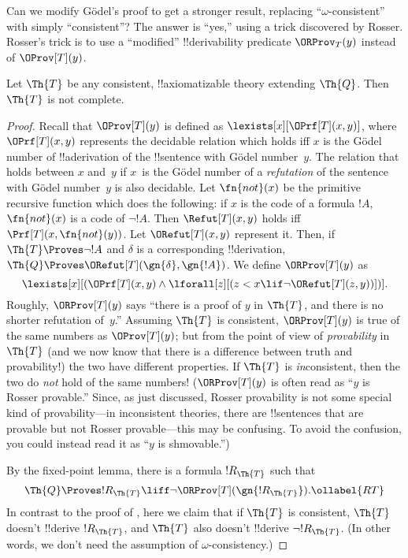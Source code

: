 \documentclass[../../../include/open-logic-section]{subfiles}
\begin{document}

Can we modify G\"odel's proof to get a stronger result, replacing
``$\omega$-consistent'' with simply ``consistent''? The answer is
``yes,'' using a trick discovered by Rosser.  Rosser's trick is to use
a ``modified'' !!{derivability} predicate $\ORProv_T(y)$ instead of
$\OProv[T](y)$.

\begin{thm}
Let $\Th{T}$ be any consistent, !!{axiomatizable} theory
extending $\Th{Q}$. Then $\Th{T}$ is not complete.
\end{thm}

\begin{proof}
Recall that $\OProv[T](y)$ is defined as $\lexists[x][\OPrf[T](x,
  y)]$, where $\OPrf[T](x, y)$ represents the decidable relation which
holds iff $x$ is the G\"odel number of !!a{derivation} of the
!!{sentence} with G\"odel number~$y$. The relation that holds between
$x$ and~$y$ if $x$~is the G\"odel number of a \emph{refutation} of the
sentence with G\"odel number~$y$ is also decidable. Let $\fn{not}(x)$
be the primitive recursive function which does the following: if $x$
is the code of a formula $!A$, $\fn{not}(x)$ is a code of $\lnot
!A$. Then $\Refut[T](x, y)$ holds iff $\Prf[T](x, \fn{not}(y))$.  Let
$\ORefut[T](x, y)$ represent it.  Then, if $\Th{T} \Proves \lnot !A$
and $\delta$ is a corresponding !!{derivation}, $\Th{Q} \Proves
\ORefut[T](\gn{\delta}, \gn{!A})$.  We define $\ORProv[T](y)$ as
\[
\lexists[x][(\OPrf[T](x,y) \land \lforall[z][(z < x \lif \lnot
  \ORefut[T](z,y))])].
\]
Roughly, $\ORProv[T](y)$ says ``there is a proof of $y$ in $\Th{T}$,
and there is no shorter refutation of~$y$.''  Assuming $\Th{T}$ is
consistent, $\ORProv[T](y)$ is true of the same numbers as
$\OProv[T](y)$; but from the point of view of \emph{provability}
in~$\Th{T}$ (and we now know that there is a difference between truth
and provability!) the two have different properties. If $\Th{T}$ is
\emph{in}consistent, then the two do \emph{not} hold of the same
numbers!{} ($\ORProv[T](y)$ is often read as ``$y$ is Rosser
provable.'' Since, as just discussed, Rosser provability is not some
special kind of provability---in inconsistent theories, there are
!!{sentence}s that are provable but not Rosser provable---this may be
confusing. To avoid the confusion, you could instead read it as
``$y$ is shmovable.'')

By the fixed-point lemma, there is a formula $!R_\Th{T}$ such that
\begin{equation}
  \Th{Q} \Proves !R_\Th{T} \liff \lnot \ORProv[T](\gn{!R_\Th{T}}).
  \ollabel{RT}
\end{equation}
In contrast to the proof of ,
here we claim that if $\Th{T}$ is consistent, $\Th{T}$ doesn't !!{derive}
$!R_\Th{T}$, and $\Th{T}$ also doesn't !!{derive} $\lnot !R_\Th{T}$. (In
other words, we don't need the assumption of $\omega$-consistency.)


\end{proof}
\end{document}
